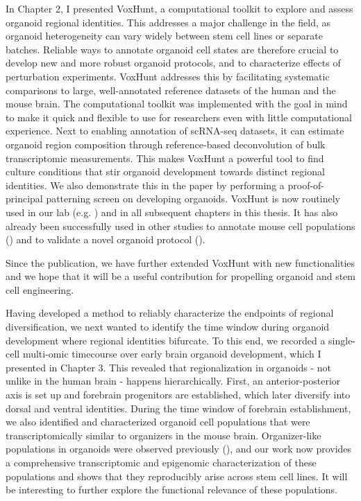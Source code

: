 In Chapter 2, I presented VoxHunt, a computational toolkit to explore and assess organoid regional identities. This addresses a major challenge in the field, as organoid heterogeneity can vary widely between stem cell lines or separate batches. Reliable ways to annotate organoid cell states are therefore crucial to develop new and more robust organoid protocols, and to characterize effects of perturbation experiments. VoxHunt addresses this by facilitating systematic comparisons to large, well-annotated reference datasets of the human and the mouse brain. The computational toolkit was implemented with the goal in mind to make it quick and flexible to use for researchers even with little computational experience. Next to enabling annotation of scRNA-seq datasets, it can estimate organoid region composition through reference-based deconvolution of bulk transcriptomic measurements. This makes VoxHunt a powerful tool to find culture conditions that stir organoid development towards distinct regional identities. We also demonstrate this in the paper by performing a proof-of-principal patterning screen on developing organoids. VoxHunt is now routinely used in our lab (e.g. \cite{kanton_organoid_2019,he_lineage_2022}) and in all subsequent chapters in this thesis. It has also already been successfully used in other studies to annotate mouse cell populations (\cite{la_manno_molecular_2020}) and to validate a novel organoid protocol (\cite{miura_generation_2020}).

Since the publication, we have further extended VoxHunt with new functionalities and we hope that it will be a useful contribution for propelling organoid and stem cell engineering.

Having developed a method to reliably characterize the endpoints of regional diversification, we next wanted to identify the time window during organoid development where regional identities bifurcate. To this end, we recorded a single-cell multi-omic timecourse over early brain organoid development, which I presented in Chapter 3. This revealed that regionalization in organoids - not unlike in the human brain - happens hierarchically. First, an anterior-posterior axis is set up and forebrain progenitors are established, which later diversify into dorsal and ventral identities. During the time window of forebrain establishment, we also identified and characterized organoid cell populations that were transcriptomically similar to organizers in the mouse brain. Organizer-like populations in organoids were observed previously (\cite{renner_self-organized_2017}), and our work now provides a comprehensive transcriptomic and epigenomic characterization of these populations and shows that they reproducibly arise across stem cell lines. It will be interesting to further explore the functional relevance of these populations. 

